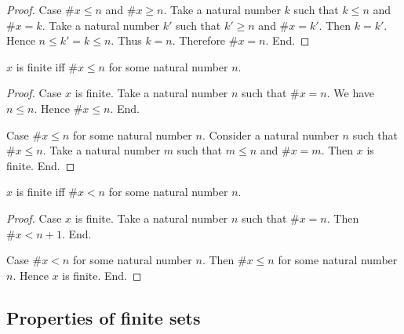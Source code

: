 \documentclass[../../set-theory.tex]{subfiles}
\begin{document}
\begin{forthel}
\begin{proof}
      Case $\# x \leq n$ and $\# x \geq n$.
        Take a natural number $k$ such that $k \leq n$ and $\# x = k$.
        Take a natural number $k'$ such that $k' \geq n$ and $\# x = k'$.
        Then $k = k'$.
        Hence $n \leq k' = k \leq n$.
        Thus $k = n$.
        Therefore $\# x = n$.
      End.
    \end{proof}

    \begin{proposition}\label{SetTheory_03_01_553120}
      $x$ is finite iff $\# x \leq n$ for some natural number $n$.
    \end{proposition}
    \begin{proof}
      Case $x$ is finite.
        Take a natural number $n$ such that $\# x = n$.
        We have $n \leq n$.
        Hence $\# x \leq n$.
      End.

      Case $\# x \leq n$ for some natural number $n$.
        Consider a natural number $n$ such that $\# x \leq n$.
        Take a natural number $m$ such that $m \leq n$ and $\# x = m$.
        Then $x$ is finite.
      End.
    \end{proof}

    \begin{corollary}\label{SetTheory_03_01_707057}
      $x$ is finite iff $\# x < n$ for some natural number $n$.
    \end{corollary}
    \begin{proof}
      Case $x$ is finite.
        Take a natural number $n$ such that $\# x = n$.
        Then $\# x < n + 1$.
      End.

      Case $\# x < n$ for some natural number $n$.
        Then $\# x \leq n$ for some natural number $n$.
        Hence $x$ is finite.
      End.
    \end{proof}
  \end{forthel}


  \subsection{Properties of finite sets}
\end{document}
